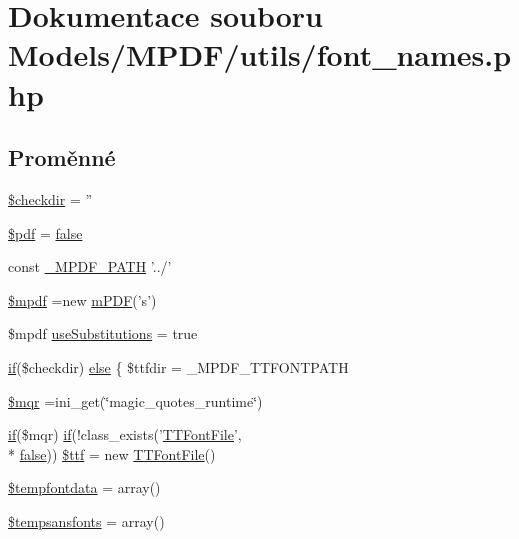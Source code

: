 \hypertarget{font__names_8php}{\section{Dokumentace souboru Models/\-M\-P\-D\-F/utils/font\-\_\-names.php}
\label{font__names_8php}
}
\subsection*{Proměnné}
\begin{DoxyCompactItemize}
\item 
\hyperlink{font__names_8php_ad773ebf7841c6538baa63f9945d7c9ca}{\$checkdir} = ''
\item 
\hyperlink{font__names_8php_a964ee5ee597c515cbb4dad2f14054cb4}{\$pdf} = \hyperlink{ttfontsuni_8php_afbaa04e5cc97693dc668b3c45d3dd740}{false}
\item 
const \hyperlink{font__names_8php_a79734099b3f1817b14687db06cde3132}{\-\_\-\-M\-P\-D\-F\-\_\-\-P\-A\-T\-H} '../'
\item 
\hyperlink{font__names_8php_ad028f81910d6cbab9b184d2214b3a8f8}{\$mpdf} =new \hyperlink{classm_p_d_f}{m\-P\-D\-F}('s')
\item 
\$mpdf \hyperlink{font__names_8php_aa2ce4c2c0ab99d3365e4d7366a9be33a}{use\-Substitutions} = true
\item 
\hyperlink{pdf__parser_8php_af8105e84b42a9ceda5357caeb6c4760b}{if}(\$checkdir) \hyperlink{font__names_8php_a5271a2344cca2dc08862484f40ba9273}{else} \{ \$ttfdir = \-\_\-\-M\-P\-D\-F\-\_\-\-T\-T\-F\-O\-N\-T\-P\-A\-T\-H
\item 
\hyperlink{font__names_8php_ad04a9e91774b9f9d3044e0c2b7636ca1}{\$mqr} =ini\-\_\-get(\char`\"{}magic\-\_\-quotes\-\_\-runtime\char`\"{})
\item 
\hyperlink{pdf__parser_8php_af8105e84b42a9ceda5357caeb6c4760b}{if}(\$mqr) \hyperlink{pdf__parser_8php_af8105e84b42a9ceda5357caeb6c4760b}{if}(!class\-\_\-exists('\hyperlink{class_t_t_font_file}{T\-T\-Font\-File}', \\*
\hyperlink{ttfontsuni_8php_afbaa04e5cc97693dc668b3c45d3dd740}{false})) \hyperlink{font__names_8php_ac30f1eb54e5b52f5b30306ee5e3b23e7}{\$ttf} = new \hyperlink{class_t_t_font_file}{T\-T\-Font\-File}()
\item 
\hyperlink{font__names_8php_a47be5bc20842a7025769908c5470c016}{\$tempfontdata} = array()
\item 
\hyperlink{font__names_8php_a941da3f5358aef0d6ec41161b4951148}{\$tempsansfonts} = array()

\end{DoxyCompactItemize}

